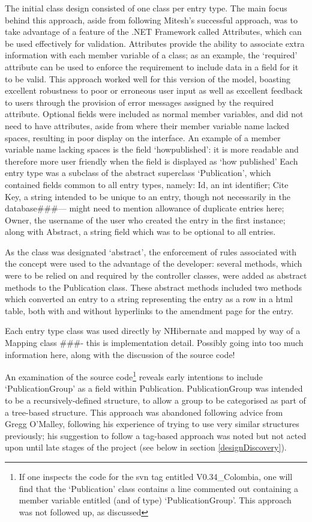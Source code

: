 \documentclass{l4proj}
\newcommand{\revisit}{\#\#\#}
\begin{document}
The initial class design consisted of one class per entry type.  The main focus behind this approach, aside from following Mitesh's successful approach, was to take advantage of a feature of the .NET Framework called Attributes, which can be used effectively for validation.  Attributes provide the ability to associate extra information with each member variable of a class; as an example, the `required' attribute can be used to enforce the requirement to include data in a field for it to be valid.  This approach worked well for this version of the model, boasting excellent robustness to poor or erroneous user input as well as excellent feedback to users through the provision of error messages assigned by the required attribute.  Optional fields were included as normal member variables, and did not need to have attributes, aside from where their member variable name lacked spaces, resulting in poor display on the interface.  An example of a member variable name lacking spaces is the field `howpublished': it is more readable and therefore more user friendly when the field is displayed as `how published' 
Each entry type was a subclass of the abstract superclass `Publication', which contained fields common to all entry types, namely: Id, an int identifier; Cite Key, a string intended to be unique to an entry, though not necessarily in the database\revisit --- might need to mention allowance of duplicate entries here; Owner, the username of the user who created the entry in the first instance; along with Abstract, a string field which was to be optional to all entries.

As the class was designated `abstract', the enforcement of rules associated with the concept were used to the advantage of the developer: several methods, which were to be relied on and required by the controller classes, were added as abstract methods to the Publication class.  These abstract methods included two methods which converted an entry to a string representing the entry as a row in a \gls{html} table, both with and without hyperlinks to the amendment page for the entry.

Each entry type class was used directly by NHibernate and mapped by way of a Mapping class \revisit - this is implementation detail. Possibly going into too much information here, along with the discussion of the source code!

An examination of the source code\footnote{If one inspects the code for the \gls{svn} tag entitled V0.34\_Colombia, one will find that the `Publication' class contains a line commented out containing a member variable entitled (and of type) `PublicationGroup'.  This approach was not followed up, as discussed} reveals early intentions to include `PublicationGroup' as a field within Publication.  PublicationGroup was intended to be a recursively-defined structure, to allow a group to be categorised as part of a tree-based structure.  This approach was abandoned following advice from Gregg O'Malley, following his experience of trying to use very similar structures previously; his suggestion to follow a tag-based approach was noted but not acted upon until late stages of the project (see below in section \ref{designDiscovery}).
\end{document}
